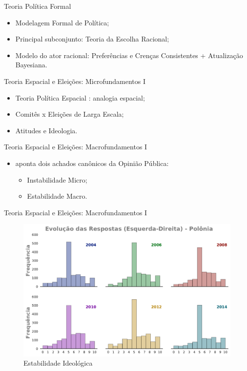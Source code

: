 \documentclass{beamer}
\begin{document}
\begin{frame}{Teoria Política Formal}

  \begin{itemize}
  \item Modelagem Formal de Política;
  \item Principal subconjunto: Teoria da Escolha Racional;
  \item Modelo do ator racional: Preferências e Crenças Consistentes + Atualização
    Bayesiana.
  \end{itemize}

\end{frame}


\begin{frame}{Teoria Espacial e Eleições: Microfundamentos I}
  \begin{itemize}
  \item Teoria Política Espacial : analogia espacial;
  \item Comitês x Eleições de Larga Escala;
  \item Atitudes e  Ideologia.
  \end{itemize}
\end{frame}

\begin{frame}{Teoria Espacial e Eleições: Macrofundamentos I }
  \begin{itemize}
\item \textcite{druckman2012public} aponta dois achados canônicos da Opinião
  Pública:
  \begin{itemize}
  \item Instabilidade Micro;
  \item Estabilidade Macro.
  \end{itemize}
  \end{itemize}
  
\end{frame}


\begin{frame}{Teoria Espacial e Eleições: Macrofundamentos I }
  \begin{figure}[H]
    \centering
    \includegraphics[scale = 0.4]{ims/ess_Pol_plots.pdf}
    \caption{Estabilidade Ideológica}
    \label{fig1}
  \end{figure}
\end{frame}
\end{document}
